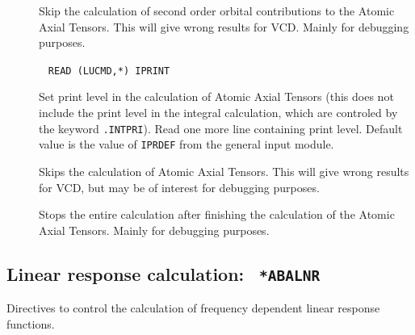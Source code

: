 \begin{description}
\item[] Skip the calculation of second order orbital
contributions to the Atomic Axial Tensors. This will give wrong
results for VCD. Mainly for debugging purposes.

\item[]\verb| |\newline
\verb|READ (LUCMD,*) IPRINT|

Set print level in the calculation of Atomic Axial Tensors (this does
not include the print level in the integral calculation, which are
controled by the keyword \verb|.INTPRI|). Read one
more line containing print level. Default value is the value of
\verb|IPRDEF| from the general input module.

\item[] Skips the calculation of Atomic Axial Tensors.
This will give wrong results for VCD, but may be of interest for
debugging purposes.

\item[] Stops the entire calculation after finishing the 
calculation of the Atomic Axial Tensors. Mainly for debugging purposes.
\end{description}

\subsection{Linear response calculation: {\tt
*ABALNR}}\label{sec:abalnr}

Directives to control the calculation of frequency dependent linear
response
functions. 

